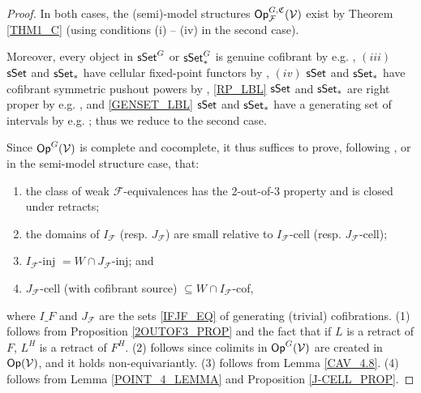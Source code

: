 \documentclass[a4paper,10pt
,draft
]{article}%
\renewcommand{\F}{\mathcal F}
\renewcommand{\1}{\eta}%
\begin{document}
\begin{proof}
      In both cases, the (semi)-model structures $\Op_\F^{G, \mathfrak C}(\V)$ exist by Theorem \ref{THM1_C}
      (using conditions (i) -- (iv) in the second case).
      
      Moreover,
      every object in $\mathsf{sSet}^G$ or $\sSet^G_{\**}$ is genuine cofibrant by e.g. \cite[Remark 5.71]{BP_geo},
      $(iii)$ $\mathsf{sSet}$ and $\sSet_{\**}$ have cellular fixed-point functors by \cite[Example 2.14]{Ste16},
      $(iv)$ $\mathsf{sSet}$ and $\sSet_{\**}$ have cofibrant symmetric pushout powers by \cite[Remark 6.18]{BP_geo},
      \ref{RP_LBL} $\mathsf{sSet}$ and $\sSet_{\**}$ are right proper by e.g. \cite[Thm. 2.1.1 and Prop 4.1.1]{JT_simp},
      and
      \ref{GENSET_LBL} $\mathsf{sSet}$ and $\sSet_{\**}$ have a generating set of intervals
      by e.g. \cite[Lemma 1.12]{BM13};
      thus we reduce to the second case.
      
      Since $\mathsf{Op}^G(\mathcal V)$ is complete and cocomplete, it thus suffices to prove,
      following \cite[Theorem 2.1.19]{Hov}, or \cite[Theorem 2.2.2]{WY} in the semi-model structure case, that:
      \begin{enumerate}[label = (\arabic*)]
      \item the class of weak $\F$-equivalences has the 2-out-of-3 property and is closed under retracts;
      \item the domains of $I_{\F}$ (resp. $J_{\F}$) are small relative to $I_{\F}$-cell (resp. $J_{\F}$-cell);
      \item $I_{\F}$-inj $= W\cap J_{\F}$-inj; and
      \item $J_{\F}$-cell (with cofibrant source) $\subseteq W\cap I_{\F}$-cof,
      \end{enumerate}
      where $I\_F$ and $J_\F$ are the sets \eqref{IFJF_EQ} of generating (trivial) cofibrations.
      (1) follows from Proposition \ref{2OUTOF3_PROP} and the fact that if $L$ is a retract of $F$, $L^H$ is a retract of $F^H$.
      (2) follows since colimits in $\mathsf{Op}^G(\mathcal V)$ are created in $\mathsf{Op}(\mathcal V)$, and it holds non-equivariantly.
      (3) follows from Lemma \ref{CAV_4.8}.
      (4) follows from Lemma \ref{POINT_4_LEMMA} and Proposition \ref{J-CELL_PROP}.
\end{proof}
\end{document}
